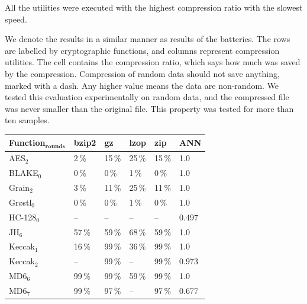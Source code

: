 \documentclass[
    digital,    %
    oneside,    %
    color,
    11pt,
    nocover,
    notable,
    nolof,
    nolot,
]{fithesis3}
\newcommand{\fd}{\cellcolor{red!25}}
\newcommand{\fn}{}
\begin{document}
All the utilities were executed with the highest compression ratio with the slowest speed.

We denote the results in a similar manner as results of the batteries. The rows are labelled by cryptographic functions, and columns represent compression utilities. The cell contains the compression ratio, which says how much was saved by the compression. Compression of random data should not save anything, marked with a dash. Any higher value means the data are non-random. We tested this evaluation experimentally on random data, and the compressed file was never smaller than the original file. This property was tested for more than ten samples.

\begin{table}[t]
\centering

\begin{tabular}{@{}l|lllll}
\textbf{\large Function$_{\textbf{rounds}}$} & 
\multicolumn{1}{R{1.1cm}}{\textbf{bzip2}} &
\multicolumn{1}{R{1.1cm}}{\textbf{gz}} &
\multicolumn{1}{R{1.1cm}}{\textbf{lzop}} &
\multicolumn{1}{R{1.1cm}}{\textbf{zip}} &
\multicolumn{1}{R{1.1cm}}{\textbf{ANN}} \\ \hline
AES$_{2}$                        & 2\,\%  \fd & 15\,\% \fd & 25\,\% \fd & 15\,\% \fd & 1.0   \fd \\ \hline
BLAKE$_{0}$                      & 0\,\%  \fd & 0\,\%  \fd & 1\,\%  \fd & 0\,\%  \fd & 1.0   \fd \\ \hline
Grain$_{2}$                      & 3\,\%  \fd & 11\,\% \fd & 25\,\% \fd & 11\,\% \fd & 1.0   \fd \\ \hline
Gr\o{}stl$_{0}$                  & 0\,\%  \fd & 0\,\%  \fd & 1\,\%  \fd & 0\,\%  \fd & 1.0   \fd \\ \hline
HC-128$_{0}$                     & --     \fn & --     \fn & --     \fn & --     \fn & 0.497 \fn \\ \hline
JH$_{6}$                         & 57\,\% \fd & 59\,\% \fd & 68\,\% \fd & 59\,\% \fd & 1.0   \fd \\ \hline
Keccak$_{1}$                     & 16\,\% \fd & 99\,\% \fd & 36\,\% \fd & 99\,\% \fd & 1.0   \fd \\
Keccak$_{2}$                     & --     \fn & 99\,\% \fd & --     \fn & 99\,\% \fd & 0.973 \fd \\ \hline
MD6$_{6}$                        & 99\,\% \fd & 99\,\% \fd & 59\,\% \fd & 99\,\% \fd & 1.0   \fd \\
MD6$_{7}$                        & 99\,\% \fd & 97\,\% \fd & --     \fn & 97\,\% \fd & 0.677 \fd \\ \hline

\end{tabular}
\end{table}
\end{document}

